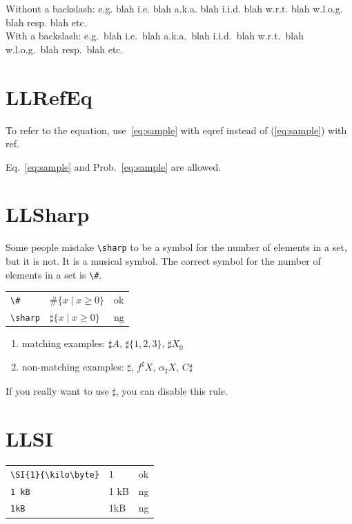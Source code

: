 \documentclass[a4paper]{article}
\newcommand{\tA}[1]{\textcolor{cA}{#1}}
\newcommand{\tD}[1]{\textcolor{cD}{#1}}
\begin{document}
Without a backslash: e.g. blah i.e. blah a.k.a. blah i.i.d. blah w.r.t. blah w.l.o.g. blah resp. blah etc.\\
\phantom{out}With a backslash: e.g.\ blah i.e.\ blah a.k.a.\ blah i.i.d.\ blah w.r.t.\ blah w.l.o.g.\ blah resp.\ blah etc.

\section{LLRefEq}

To refer to the equation, use~\eqref{eq:sample} with eqref instead of (\ref{eq:sample}) with ref.

Eq.~\ref{eq:sample} and Prob.~\ref{eq:sample} are allowed.

\section{LLSharp}

Some people mistake \verb|\sharp| to be a symbol for the number of elements in a set, but it is not.
It is a musical symbol.
The correct symbol for the number of elements in a set is \verb|\#|.

\begin{table}[H]
	\centering
	\begin{tabular}{lll}
		\verb|\#|     & $\#\{ x \mid x \geq 0 \}$                      & \tA{ok} \\
		\verb|\sharp| & \hspace{0.11em} $\sharp \{ x \mid x \geq 0 \}$ & \tD{ng} \\
	\end{tabular}
\end{table}

\begin{enumerate}[label=\textbullet]
	\item matching examples: $\sharp A$, $\sharp \{1,2,3\}$, $\sharp X_{0}$
	\item non-matching examples: ${\sharp}$, $f^\sharp X$, $\alpha_\sharp X$, $C\sharp$
\end{enumerate}

If you really want to use $\sharp$, you can disable this rule.

\section{LLSI}

\begin{table}[H]
	\centering
	\begin{tabular}{lll}
		\verb|\SI{1}{\kilo\byte}| & \SI{1}{\kilo\byte} & \tA{ok} \\
		\verb|1 kB|               & 1 kB               & \tD{ng} \\
		\verb|1kB|                & 1kB                & \tD{ng} \\
	\end{tabular}
\end{table}
\end{document}
